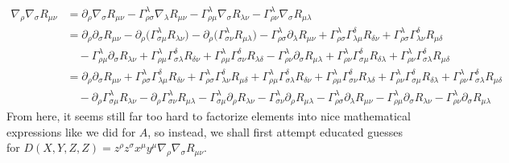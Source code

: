 \documentclass[a4paper,11pt]{article}
\numberwithin{equation}{section}
\theoremstyle{definition}
\begin{document}
\begin{align*}
    \nabla_\rho \nabla_\sigma R_{\mu\nu} &=
    \partial_\rho \nabla_\sigma R_{\mu\nu}
    - \Gamma_{\rho\sigma}^\lambda \nabla_\lambda R_{\mu\nu}
    - \Gamma_{\rho\mu}^\lambda \nabla_\sigma R_{\lambda\nu}
    - \Gamma_{\rho\nu}^\lambda \nabla_\sigma R_{\mu\lambda}\\
    &=\partial_\rho \partial_\sigma R_{\mu\nu}
    - \partial_\rho\big( \Gamma_{\sigma\mu}^\lambda R_{\lambda\nu} \big)
    - \partial_\rho \big( \Gamma_{\sigma\nu}^\lambda R_{\mu\lambda} \big)
    - \Gamma_{\rho\sigma}^\lambda \partial_\lambda R_{\mu\nu}
    + \Gamma_{\rho\sigma}^\lambda \Gamma_{\lambda\mu}^\delta R_{\delta\nu}
    + \Gamma_{\rho\sigma}^\lambda \Gamma_{\lambda\nu}^\delta R_{\mu\delta}\\
    &\quad- \Gamma_{\rho\mu}^\lambda \partial_\sigma R_{\lambda\nu}
    + \Gamma_{\rho\mu}^\lambda \Gamma_{\sigma\lambda}^\delta R_{\delta\nu}
    + \Gamma_{\rho\mu}^\lambda \Gamma_{\sigma\nu}^\delta R_{\lambda\delta}
    - \Gamma_{\rho\nu}^\lambda \partial_\sigma R_{\mu\lambda}
    + \Gamma_{\rho\nu}^\lambda \Gamma_{\sigma\mu}^\delta R_{\delta\lambda}
    + \Gamma_{\rho\nu}^\lambda \Gamma_{\sigma\lambda}^\delta R_{\mu\delta}\\
    &=\partial_\rho \partial_\sigma R_{\mu\nu}
    + \Gamma_{\rho\sigma}^\lambda \Gamma_{\lambda\mu}^\delta R_{\delta\nu}
    + \Gamma_{\rho\sigma}^\lambda \Gamma_{\lambda\nu}^\delta R_{\mu\delta}
    + \Gamma_{\rho\mu}^\lambda \Gamma_{\sigma\lambda}^\delta R_{\delta\nu}
    + \Gamma_{\rho\mu}^\lambda \Gamma_{\sigma\nu}^\delta R_{\lambda\delta}
    + \Gamma_{\rho\nu}^\lambda \Gamma_{\sigma\mu}^\delta R_{\delta\lambda}
    + \Gamma_{\rho\nu}^\lambda \Gamma_{\sigma\lambda}^\delta R_{\mu\delta}\\
    &\quad - \partial_\rho \Gamma_{\sigma\mu}^\lambda R_{\lambda\nu}
    - \partial_\rho \Gamma_{\sigma\nu}^\lambda R_{\mu\lambda}
    - \Gamma_{\sigma\mu}^\lambda \partial_\rho R_{\lambda\nu}
    - \Gamma_{\sigma\nu}^\lambda \partial_\rho R_{\mu\lambda}
    - \Gamma_{\rho\sigma}^\lambda \partial_\lambda R_{\mu\nu}
    - \Gamma_{\rho\mu}^\lambda \partial_\sigma R_{\lambda\nu}
    - \Gamma_{\rho\nu}^\lambda \partial_\sigma R_{\mu\lambda}
\end{align*}
From here, it seems still far too hard to factorize elements into nice mathematical expressions like we did for $A$, so instead, we shall first attempt educated guesses for $D(X,Y,Z,Z)=z^\rho z^\sigma x^\mu y^\mu \nabla_\rho \nabla_\sigma R_{\mu\nu}$.
\end{document}
